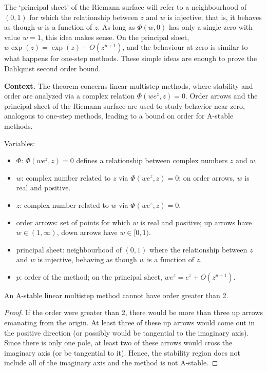 \begin{theorem}
\begin{definition}
The `principal sheet' of the Riemann surface will refer to a neighbourhood of $(0, 1)$ for which the relationship between $z$ and $w$ is injective; that is, it behaves as though $w$ is a function of $z$. As long as $\Phi(w, 0)$ has only a single zero with value $w = 1$, this idea makes sense. On the principal sheet, $w \exp(z) = \exp(z) + O(z^{p+1})$, and the behaviour at zero is similar to what happens for one-step methods. These simple ideas are enough to prove the Dahlquist second order bound.
\end{definition}

\noindent\textbf{Context.} The theorem concerns linear multistep methods, where stability and order are analyzed via a complex relation \(\Phi(w e^{z}, z) = 0\). Order arrows and the principal sheet of the Riemann surface are used to study behavior near zero, analogous to one-step methods, leading to a bound on order for A-stable methods.

Variables:
\begin{itemize}
    \item \(\Phi\): \(\Phi(w e^{z}, z) = 0\) defines a relationship between complex numbers \(z\) and \(w\).
    \item \(w\): complex number related to \(z\) via \(\Phi(w e^{z}, z) = 0\); on order arrows, \(w\) is real and positive.
    \item \(z\): complex number related to \(w\) via \(\Phi(w e^{z}, z) = 0\).
    \item order arrows: set of points for which \(w\) is real and positive; up arrows have \(w \in (1, \infty)\), down arrows have \(w \in [0, 1)\).
    \item principal sheet: neighbourhood of \((0, 1)\) where the relationship between \(z\) and \(w\) is injective, behaving as though \(w\) is a function of \(z\).
    \item \(p\): order of the method; on the principal sheet, \(w e^{z} = e^{z} + O(z^{p+1})\).
\end{itemize}

\begin{theorem}

  \label{thm:443A}
An A-stable linear multistep method cannot have order greater than 2.
\end{theorem}

\begin{proof}
If the order were greater than 2, there would be more than three up arrows emanating from the origin. At least three of these up arrows would come out in the positive direction (or possibly would be tangential to the imaginary axis). Since there is only one pole, at least two of these arrows would cross the imaginary axis (or be tangential to it). Hence, the stability region does not include all of the imaginary axis and the method is not A-stable.


\end{proof}
\end{theorem}
